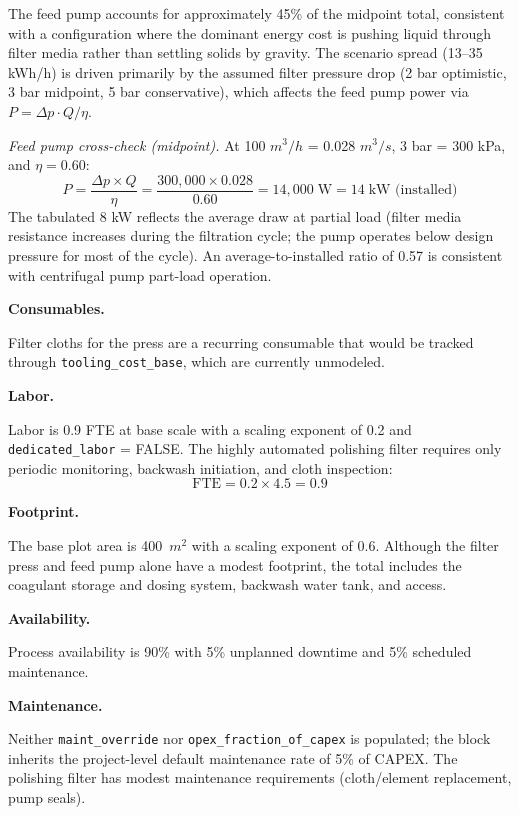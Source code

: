 \noindent The feed pump accounts for approximately 45\% of the midpoint total, consistent with a configuration where the dominant energy cost is pushing liquid through filter media rather than settling solids by gravity. The scenario spread (13--35 kWh/h) is driven primarily by the assumed filter pressure drop (2 bar optimistic, 3 bar midpoint, 5 bar conservative), which affects the feed pump power via $P = \Delta p \cdot Q / \eta$.

\textit{Feed pump cross-check (midpoint).} At 100 $\si{m^3/h}$ = 0.028 $\si{m^3/s}$, 3 bar = 300 kPa, and $\eta = 0.60$:
\[
	P = \frac{\Delta p \times Q}{\eta} = \frac{300{,}000 \times 0.028}{0.60} = 14{,}000 \;\text{W} = 14 \;\text{kW (installed)}
\]
The tabulated 8 kW reflects the average draw at partial load (filter media resistance increases during the filtration cycle; the pump operates below design pressure for most of the cycle). An average-to-installed ratio of 0.57 is consistent with centrifugal pump part-load operation.

\medskip
\noindent\textbf{Consumables.}\quad

Filter cloths for the press are a recurring consumable that would be tracked through \texttt{tooling\_cost\_base}, which are currently unmodeled.

\medskip
\noindent\textbf{Labor.}\quad

Labor is 0.9 FTE at base scale with a scaling exponent of 0.2 and \texttt{dedicated\_labor} = FALSE. The highly automated polishing filter requires only periodic monitoring, backwash initiation, and cloth inspection:
\[
	\text{FTE} = 0.2 \times 4.5 = 0.9
\]

\medskip
\noindent\textbf{Footprint.}\quad

The base plot area is 400~$\si{m^2}$ with a scaling exponent of 0.6. Although the filter press and feed pump alone have a modest footprint, the total includes the coagulant storage and dosing system, backwash water tank, and access.

\medskip
\noindent\textbf{Availability.}\quad

Process availability is 90\% with 5\% unplanned downtime and 5\% scheduled maintenance.

\medskip
\noindent\textbf{Maintenance.}\quad

Neither \texttt{maint\_override} nor \texttt{opex\_fraction\_of\_capex} is populated; the block inherits the project-level default maintenance rate of 5\% of CAPEX. The polishing filter has modest maintenance requirements (cloth/element replacement, pump seals).

